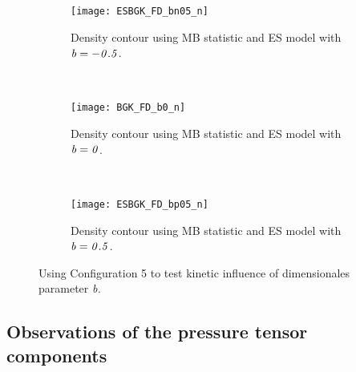 \documentclass{rsproca}%
\begin{document}
\begin{figure}
        \centering
        \begin{subfigure}[b]{0.32\textwidth}
                \centering
                \texttt{[image: ESBGK\_FD\_bn05\_n]}
                \caption{Density contour using MB statistic and ES model with $\it{b=-0.5}$.}
                \label{fig:ESBGK_FD_bn05_n}
        \end{subfigure}%
        ~ %
        \begin{subfigure}[b]{0.32\textwidth}
                \centering
                \texttt{[image: BGK\_FD\_b0\_n]}
                \caption{Density contour using MB statistic and ES model with $\it{b=0}$.}
                \label{fig:BGK_FD_b0_n}
        \end{subfigure}
        ~ %
        \begin{subfigure}[b]{0.32\textwidth}
                \centering
                \texttt{[image: ESBGK\_FD\_bp05\_n]}
                \caption{Density contour using MB statistic and ES model with $\it{b=0.5}$.}
                \label{fig:ESBGK_FD_bp05_n}
        \end{subfigure}
        \caption{Using Configuration 5 to test kinetic influence of dimensionales parameter \it{b}.}\label{fig:test_b_parameter}
\end{figure}

\subsection{Observations of the pressure tensor components}
\end{document}
